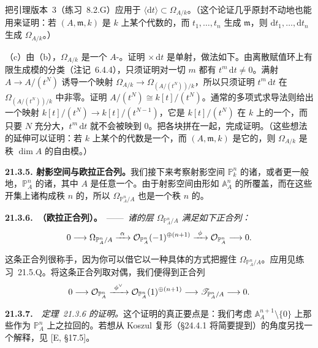 把\trNakayama{}引理版本~3（\mbox{练习~8.2.G}）应用于 $\langle\mathrm{d}t\rangle\subset\Omega_{A/k}$。（这个论证几乎原封不动地也能用来证明：若 $(A,\mathfrak{m},k)$ 是 $k$ 上某个\trFinitelyGenerated{}代数的\trLocalization，而 $t_1,\dots,t_n$ 生成 $\mathfrak{m}$，则 $\mathrm{d}t_1,\dots,\mathrm{d}t_n$ 生成 $\Omega_{A/k}$。）

（c）由（b），$\Omega_{A/k}$ 是一个\trPrincipal{} $A$-\trModule。证明 $\times\,\mathrm{d}t$ 是单射，做法如下。由离散赋值环上有限生成模的分类（\mbox{注记~6.4.4}），只须证明对一切 $m$ 都有 $t^m\,\mathrm{d}t\ne0$。满射 $A\to A/(t^N)$ 诱导一个映射 $\Omega_{A/k}\to\Omega_{(A/(t^N))/k}$，所以只须证明 $t^m\,\mathrm{d}t$ 在 $\Omega_{(A/(t^N))/k}$ 中非零。证明 $A/(t^N)\cong k[t]/(t^N)$。通常的多项式求导法则给出一个映射 $k[t]/(t^N)\to k[t]/(t^{N-1})$，它是 $k[t]/(t^N)$ 在 $k$ 上的一个\trDerivation，而只要 $N$ 充分大，$t^m\,\mathrm{d}t$ 就不会被映到 $0$。把各块拼在一起，完成证明。（这些想法的延伸可以证明：若 $k$ 上某个\trFinitelyGenerated{}的代数是一个\trRegular\trLocalRing，而 $(A,\mathfrak{m},k)$ 是它的\trLocalization，则 $\Omega_{A/k}$ 是秩 $\dim A$ 的自由模。）

\textbf{21.3.5. 射影空间与欧拉正合列。}\quad 我们接下来考察射影空间 $\mathbb{P}^n_k$ 的诸\trDifferential，或者更一般地，$\mathbb{P}^n_A$ 的诸\trDifferential，其中 $A$ 是任意一个\trRing。由于射影空间由形如 $\mathbb{A}^n_A$ 的\trAffine\trOpenSubset{}所覆盖，而在这些开集上诸\trDifferential{}构成秩 $n$ 的\trLocallyFreeSheaf，所以 $\Omega_{\mathbb{P}^n_A/A}$ 也是一个秩 $n$ 的\trLocallyFreeSheaf。

\textbf{21.3.6.\ \trhTheorem（欧拉正合列）。}\ ——\ \emph{诸\trDifferential{}的层 $\Omega_{\mathbb{P}^n_A/A}$ 满足如下正合列：}
\[
0\longrightarrow\Omega_{\mathbb{P}^n_A/A}\xrightarrow{\ \alpha\ }\OO_{\mathbb{P}^n_A}(-1)^{\oplus(n+1)}\xrightarrow{\ \phi\ }\OO_{\mathbb{P}^n_A}\longrightarrow 0.
\]

这条正合列很称手，因为你可以借它以一种具体的方式把握住 $\Omega_{\mathbb{P}^n_A/A}$。应用见\mbox{练习~21.5.Q}。将这条正合列取对偶，我们便得到正合列
\[
0\longrightarrow\OO_{\mathbb{P}^n_A}\xrightarrow{\ \phi^\vee\ }\OO_{\mathbb{P}^n_A}(1)^{\oplus(n+1)}\longrightarrow\mathscr{T}_{\mathbb{P}^n_A/A}\longrightarrow 0.
\]

\textbf{21.3.7.}\ \hard\ \emph{\mbox{定理~21.3.6} 的证明。}\quad 这个证明的真正要点是：我们考虑 $\mathbb{A}^{n+1}_A\setminus\{0\}$ 上那些作为 $\mathbb{P}^n_A$ 上\trDifferential{}之拉回的\trDifferential。若想从 Koszul 复形（\S24.4.1 将简要提到）的角度另找一个解释，见 [E, \S17.5]。

